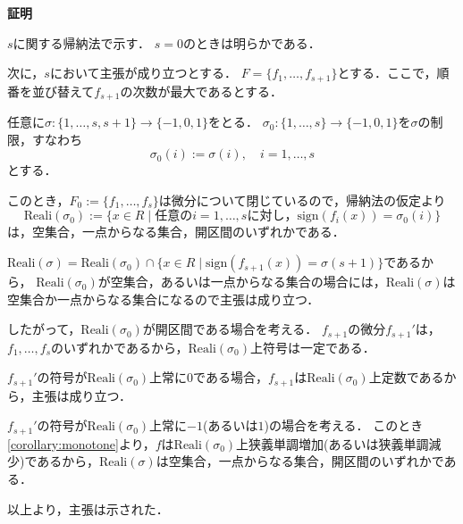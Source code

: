 \documentclass[uplatex, dvipdfmx]{jsarticle}
\makeatletter
\numberwithin{equation}{section}
\renewenvironment{proof}[1][\proofname]{\par
  \pushQED{\qed}%
  \normalfont \topsep6\p@\@plus6\p@\relax
  \trivlist
  \item\relax
  {\bfseries
  #1\@addpunct{.}}\hspace\labelsep\ignorespaces
}{
  \popQED\endtrivlist\@endpefalse
}
\newcommand{\Reali}{\mathrm{Reali}}
\newcommand{\sign}{\mathrm{sign}}
\newcommand{\map}[3]{{#1}\colon{#2}\rightarrow{#3}}
\theoremstyle{definition}
\renewcommand{\proofname}{\textbf{証明}}
\makeatother
\begin{document}
\begin{proof}
     $s$に関する帰納法で示す．
     $s = 0$のときは明らかである．
     
     次に，$s$において主張が成り立つとする．
     $F = \{f_1, \dots, f_{s+1}\}$とする．ここで，順番を並び替えて$f_{s+1}$の次数が最大であるとする．

     任意に$\map{\sigma}{\{1, \dots, s, s+1\}}{\{-1,0,1\}}$をとる．
     $\map{\sigma_0}{\{1, \dots, s\}}{\{-1,0,1\}}$を$\sigma$の制限，すなわち
     \begin{equation}
          \sigma_0(i) := \sigma(i), \quad i=1, \dots, s
     \end{equation}
     とする．

     このとき，$F_0 := \{f_1, \dots, f_{s}\}$は微分について閉じているので，帰納法の仮定より
     \begin{equation}
          \Reali({\sigma_0}):=\{x \in R \mid \text{任意の$i=1, \dots, s$に対し，} \sign(f_i(x)) = \sigma_0(i)\}
     \end{equation}
     は，空集合，一点からなる集合，開区間のいずれかである．

     $\Reali(\sigma) = \Reali({\sigma_0}) \cap \{x \in R \mid \sign(f_{s+1}(x)) = \sigma(s+1)\}$であるから，
     $\Reali({\sigma_0})$が空集合，あるいは一点からなる集合の場合には，$\Reali(\sigma)$は空集合か一点からなる集合になるので主張は成り立つ．

     したがって，$\Reali({\sigma_0})$が開区間である場合を考える．
     $f_{s+1}$の微分$f_{s+1}'$は，$f_1, \dots, f_s$のいずれかであるから，$\Reali({\sigma_0})$上符号は一定である．

     $f_{s+1}'$の符号が$\Reali({\sigma_0})$上常に$0$である場合，$f_{s+1}$は$\Reali({\sigma_0})$上定数であるから，主張は成り立つ．

     $f_{s+1}'$の符号が$\Reali({\sigma_0})$上常に$-1$(あるいは$1$)の場合を考える．
     このとき\cref{corollary:monotone}より，$f$は$\Reali({\sigma_0})$上狭義単調増加(あるいは狭義単調減少)であるから，$\Reali(\sigma)$は空集合，一点からなる集合，開区間のいずれかである．

     以上より，主張は示された．
\end{proof}
\end{document}
